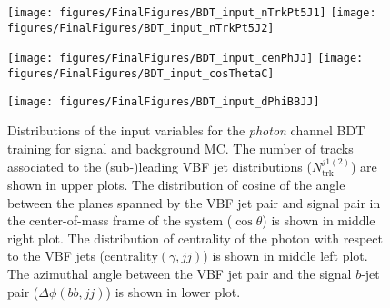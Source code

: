 \documentclass[PAPER, american,coverpage,texlive=2016, english]{\ATLASLATEXPATH atlasdoc}
\providecommand{\DIFaddbeginFL}{} %
\providecommand{\DIFaddendFL}{} %
\providecommand{\DIFdelbeginFL}{} %
\providecommand{\DIFdelendFL}{} %
\begin{document}
\begin{figure}[htbp]
  \centering

  \DIFdelbeginFL %
\DIFdelendFL \DIFaddbeginFL \texttt{[image: figures/FinalFigures/BDT\_input\_nTrkPt5J1]}
  \texttt{[image: figures/FinalFigures/BDT\_input\_nTrkPt5J2]}

\DIFaddendFL 

  \DIFdelbeginFL %
\DIFdelendFL \DIFaddbeginFL \texttt{[image: figures/FinalFigures/BDT\_input\_cenPhJJ]}
  \texttt{[image: figures/FinalFigures/BDT\_input\_cosThetaC]}

\DIFaddendFL 

  \DIFdelbeginFL %
\DIFdelendFL \DIFaddbeginFL \texttt{[image: figures/FinalFigures/BDT\_input\_dPhiBBJJ]}
  \DIFaddendFL \caption{Distributions of the input variables for the \textit{photon} channel BDT training for signal and background MC.  The number of tracks associated to the (sub-)leading VBF jet distributions ($N_{\text{trk}}^{j1(2)}$) are shown in upper plots.   The distribution of cosine of the angle between the planes spanned by the VBF jet pair and signal pair in the center-of-mass frame of the  system ($\cos{\theta}$) is shown in middle right plot. The distribution of centrality of the photon with respect to the VBF jets ($\text{centrality}(\gamma,jj)$) is shown in middle left plot.  The azimuthal angle between the VBF jet pair and the signal $b$-jet pair ($\Delta\phi(bb,jj)$) is shown in lower plot.}
  \label{fig:bdtvar2}
\end{figure}
\end{document}
